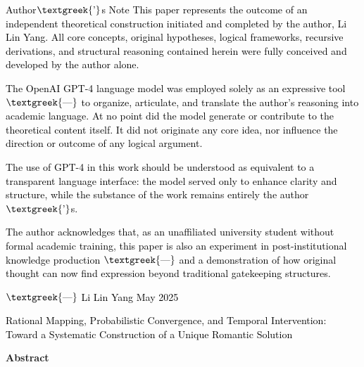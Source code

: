\documentclass[a4paper]{article}
\author{XYZT A}
\date{2025-07-14}
\begin{document}
\textcolor{black}{Author$\text{\textgreek{’}}$s Note}\newline
\textcolor{black}{This paper represents the outcome of an independent theoretical construction initiated and completed
by the author, Li Lin Yang. All core concepts, original hypotheses, logical frameworks, recursive derivations, and
structural reasoning contained herein were fully conceived and developed by the author alone.}

\textcolor{black}{The OpenAI GPT-4 language model was employed solely as an expressive tool $\text{\textgreek{—}}$ to
organize, articulate, and translate the author's reasoning into academic language. At no point did the model generate
or contribute to the theoretical content itself. It did not originate any core idea, nor influence the direction or
outcome of any logical argument.}

\textcolor{black}{The use of GPT-4 in this work should be understood as equivalent to a transparent language interface:
the model served only to enhance clarity and structure, while the substance of the work remains entirely the
author$\text{\textgreek{’}}$s.}

\textcolor{black}{The author acknowledges that, as an unaffiliated university student without formal academic training,
this paper is also an experiment in post-institutional knowledge production $\text{\textgreek{—}}$ and a demonstration
of how original thought can now find expression beyond traditional gatekeeping structures.}

\textcolor{black}{$\text{\textgreek{—}}$ Li Lin Yang\newline
May 2025}


\bigskip


\bigskip


\bigskip


\bigskip


\bigskip


\bigskip


\bigskip

{\centering
\textcolor{black}{Rational Mapping, Probabilistic Convergence, and Temporal Intervention: Toward a Systematic
Construction of a Unique Romantic Solution}
\par}

\textbf{Abstract}
\end{document}
